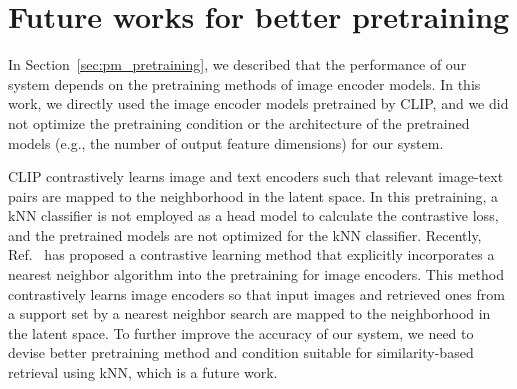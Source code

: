 \documentclass[runningheads]{llncs}
\begin{document}
\begin{table}[b]
\caption{Final accuracy evaluation in class incremental setting with ResNet-50 on Split CIFAR-100.}
\centering
{}
\label{table:accuracy_inclearn}
\end{table}


\section{Future works for better pretraining}

In Section~\ref{sec:pm_pretraining}, we described that the performance of our system depends on the pretraining methods of image encoder models.
In this work, we directly used the image encoder models pretrained by CLIP, and we did not optimize the pretraining condition or the architecture of the pretrained models (e.g., the number of output feature dimensions) for our system.

CLIP contrastively learns image and text encoders such that relevant image-text pairs are mapped to the neighborhood in the latent space.
In this pretraining, a kNN classifier is not employed as a head model to calculate the contrastive loss, and the pretrained models are not optimized for the kNN classifier.
Recently, Ref.~\cite{NNCLR} has proposed a contrastive learning method that explicitly incorporates a nearest neighbor algorithm into the pretraining for image encoders.
This method contrastively learns image encoders so that input images and retrieved ones from a support set by a nearest neighbor search are mapped to the neighborhood in the latent space.
To further improve the accuracy of our system, we need to devise better pretraining method and condition suitable for similarity-based retrieval using kNN, which is a future work.
\end{document}

